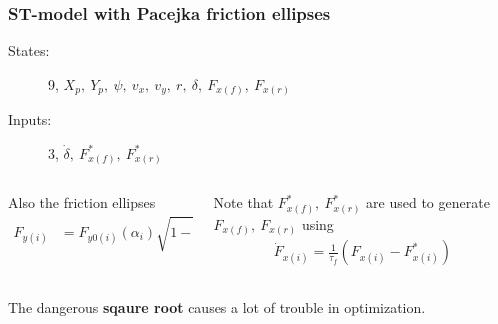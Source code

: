 \begin{frame}
    \frametitle{ST-model with Pacejka friction ellipses}
    \begin{block}{}
        \begin{description}
            \item[States:] 9, $X_p,\ Y_p,\ \psi,\ v_x,\ v_y,\ r,\ \delta,\ F_{x(f)},\ F_{x(r)}$
            \item[Inputs:] 3, $\dot \delta,\ F_{x(f)}^*,\ F_{x(r)}^*$
        \end{description}
    \end{block}
    \vspace{10pt}
    \pause
    \begin{columns}
        \begin{column}{0.45\textwidth}
            Also the friction ellipses 
            \begin{align*}
                F_{y(i)} &= F_{y0(i)}\left(\alpha_i\right)\sqrt{1 - \left(\frac{F_{x(i)}}{F_{x0(i)}^{\text   {max}}}\right)}
            \end{align*}
        \end{column}\pause
        \begin{column}{0.45\textwidth}
            Note that $F_{x(f)}^*,\ F_{x(r)}^*$ are used to generate $F_{x(f)},\ F_{x(r)}$ using
            \begin{align*}
                \dot F_{x(i)} = \frac{1}{\tau_f}\left(F_{x(i)} - F_{x(i)}^*\right)
            \end{align*}
        \end{column}
    \end{columns}
    \vspace{10pt}
    \begin{alertblock}{}
        The dangerous \textbf{sqaure root} causes a lot of trouble in optimization.
    \end{alertblock}
\end{frame}